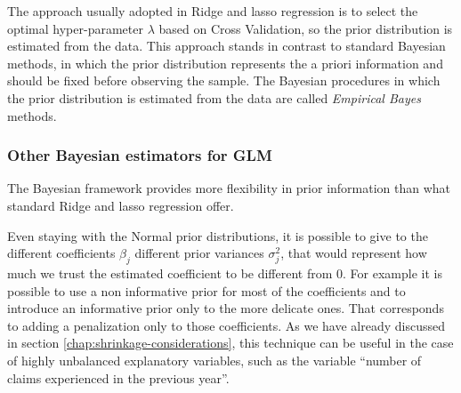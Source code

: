 \documentclass[a4paper, twoside, openright, 12pt]{report}
\let\origfigure\figure
\let\endorigfigure\endfigure
\renewenvironment{figure}[1][2] {
  \expandafter\origfigure\expandafter[!hbtp]
} {
  \endorigfigure
}
\theoremstyle{definition}
\theoremstyle{definition}
\theoremstyle{definition}
\theoremstyle{remark}
\begin{document}
\begin{figure}[!hbtp]

{\centering {}\newline{}

}

\caption[Normal density function, Laplace density function and Elastic Net prior density function with unitary variance.]{Normal density function, Laplace density function and Elastic Net prior density function with unitary variance.}\label{fig:normal-laplace}
\end{figure}

The approach usually adopted in Ridge and \ac{lasso} regression is to select the optimal hyper-parameter \(\lambda\) based on Cross Validation, so the prior distribution is estimated from the data. This approach stands in contrast to standard Bayesian methods, in which the prior distribution represents the a priori information and should be fixed before observing the sample. The Bayesian procedures in which the prior distribution is estimated from the data are called \emph{Empirical Bayes} methods.

\hypertarget{other-bayesian-estimators-for-glm}{%
\subsubsection{Other Bayesian estimators for GLM}\label{other-bayesian-estimators-for-glm}}

The Bayesian framework provides more flexibility in prior information than what standard Ridge and \ac{lasso} regression offer.

Even staying with the Normal prior distributions, it is possible to give to the different coefficients \(\beta_j\) different prior variances \(\sigma_j^2\), that would represent how much we trust the estimated coefficient to be different from \(0\). For example it is possible to use a non informative prior for most of the coefficients and to introduce an informative prior only to the more delicate ones. That corresponds to adding a penalization only to those coefficients. As we have already discussed in section \ref{chap:shrinkage-considerations}, this technique can be useful in the case of highly unbalanced explanatory variables, such as the variable ``number of claims experienced in the previous year''.
\end{document}
